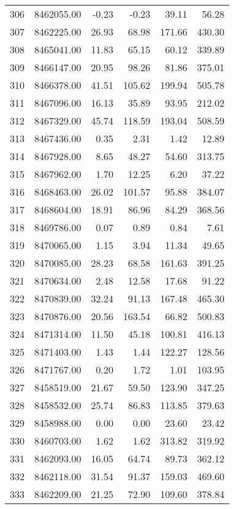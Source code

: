 \begin{table}[ht]
\begin{tabular}{rrrrrr}
  306 & 8462055.00 & -0.23 & -0.23 & 39.11 & 56.28 \\ 
  307 & 8462225.00 & 26.93 & 68.98 & 171.66 & 430.30 \\ 
  308 & 8465041.00 & 11.83 & 65.15 & 60.12 & 339.89 \\ 
  309 & 8466147.00 & 20.95 & 98.26 & 81.86 & 375.01 \\ 
  310 & 8466378.00 & 41.51 & 105.62 & 199.94 & 505.78 \\ 
  311 & 8467096.00 & 16.13 & 35.89 & 93.95 & 212.02 \\ 
  312 & 8467329.00 & 45.74 & 118.59 & 193.04 & 508.59 \\ 
  313 & 8467436.00 & 0.35 & 2.31 & 1.42 & 12.89 \\ 
  314 & 8467928.00 & 8.65 & 48.27 & 54.60 & 313.75 \\ 
  315 & 8467962.00 & 1.70 & 12.25 & 6.20 & 37.22 \\ 
  316 & 8468463.00 & 26.02 & 101.57 & 95.88 & 384.07 \\ 
  317 & 8468604.00 & 18.91 & 86.96 & 84.29 & 368.56 \\ 
  318 & 8469786.00 & 0.07 & 0.89 & 0.84 & 7.61 \\ 
  319 & 8470065.00 & 1.15 & 3.94 & 11.34 & 49.65 \\ 
  320 & 8470085.00 & 28.23 & 68.58 & 161.63 & 391.25 \\ 
  321 & 8470634.00 & 2.48 & 12.58 & 17.68 & 91.22 \\ 
  322 & 8470839.00 & 32.24 & 91.13 & 167.48 & 465.30 \\ 
  323 & 8470876.00 & 20.56 & 163.54 & 66.82 & 500.83 \\ 
  324 & 8471314.00 & 11.50 & 45.18 & 100.81 & 416.13 \\ 
  325 & 8471403.00 & 1.43 & 1.44 & 122.27 & 128.56 \\ 
  326 & 8471767.00 & 0.20 & 1.72 & 1.01 & 103.95 \\ 
  327 & 8458519.00 & 21.67 & 59.50 & 123.90 & 347.25 \\ 
  328 & 8458532.00 & 25.74 & 86.83 & 113.85 & 379.63 \\ 
  329 & 8458988.00 & 0.00 & 0.00 & 23.60 & 23.42 \\ 
  330 & 8460703.00 & 1.62 & 1.62 & 313.82 & 319.92 \\ 
  331 & 8462093.00 & 16.05 & 64.74 & 89.73 & 362.12 \\ 
  332 & 8462118.00 & 31.54 & 91.37 & 159.03 & 469.60 \\ 
  333 & 8462209.00 & 21.25 & 72.90 & 109.60 & 378.84 \\ 

\end{tabular}
\end{table}
